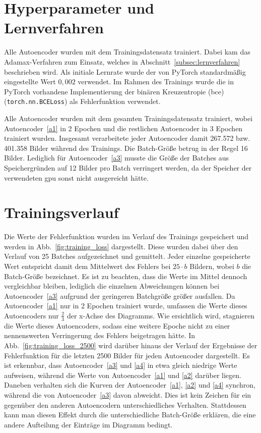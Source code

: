 \section{Hyperparameter und Lernverfahren}
\label{sec:hyperparameter}
Alle Autoencoder wurden mit dem Trainingsdatensatz trainiert. Dabei kam das Adamax-Verfahren zum Einsatz, welches in Abschnitt~\ref{subsec:lernverfahren} beschrieben wird. Als initiale Lernrate wurde der von PyTorch standardmäßig eingestellte Wert $0,002$ verwendet. Im Rahmen des Trainings wurde die in PyTorch vorhandene Implementierung der binären Kreuzentropie (\gls{bce}) (\texttt{torch.nn.BCELoss})  als Fehlerfunktion verwendet.

Alle Autoencoder wurden mit dem gesamten Trainingsdatensatz trainiert, wobei Autoencoder~\ref{a1} in 2 Epochen und die restlichen Autoencoder in 3 Epochen trainiert wurden. Insgesamt verarbeitete jeder Autoencoder damit 267.572 bzw. 401.358 Bilder während des Trainings. Die Batch-Größe betrug in der Regel 16 Bilder. Lediglich für Autoencoder~\ref{a3} musste die Größe der Batches aus Speichergründen auf 12 Bilder pro Batch verringert werden, da der Speicher der verwendeten \gls{gpu} sonst nicht ausgereicht hätte.

\section{Trainingsverlauf}
Die Werte der Fehlerfunktion wurden im Verlauf des Trainings gespeichert und werden in Abb.~\ref{fig:training_loss} dargestellt. Diese wurden dabei über den Verlauf von 25 Batches aufgezeichnet und gemittelt. Jeder einzelne gespeicherte Wert entspricht damit dem Mittelwert des Fehlers bei $25 \cdot b$ Bildern, wobei $b$ die Batch-Größe bezeichnet. Es ist zu beachten, dass die Werte im Mittel dennoch vergleichbar bleiben, lediglich die einzelnen Abweichungen können bei Autoencoder~\ref{a3} aufgrund der geringeren Batchgröße größer ausfallen. Da Autoencoder~\ref{a1} nur in 2 Epochen trainiert wurde, umfassen die Werte dieses Autoencoders nur $\frac{2}{3}$ der x-Achse des Diagramms. Wie ersichtlich wird, stagnieren die Werte dieses Autoencoders, sodass eine weitere Epoche nicht zu einer nennenswerten Verringerung des Fehlers beigetragen hätte.
In Abb.~\ref{fig:training_loss_2500} wird darüber hinaus der Verlauf der Ergebnisse der Fehlerfunktion für die letzten 2500 Bilder für jeden Autoencoder dargestellt. Es ist erkennbar, dass Autoencoder~\ref{a3} und \ref{a4} in etwa gleich niedrige Werte aufweisen, während die Werte von Autoencoder~\ref{a1} und \ref{a2} darüber liegen. Daneben verhalten sich die Kurven der Autoencoder~\ref{a1}, \ref{a2} und \ref{a4} synchron, während die von Autoencoder~\ref{a3} davon abweicht. Dies ist kein Zeichen für ein gegenüber den anderen Autoencodern unterschiedliches Verhalten. Stattdessen kann man diesen Effekt durch die unterschiedliche Batch-Größe erklären, die eine andere Aufteilung der Einträge im Diagramm bedingt.

